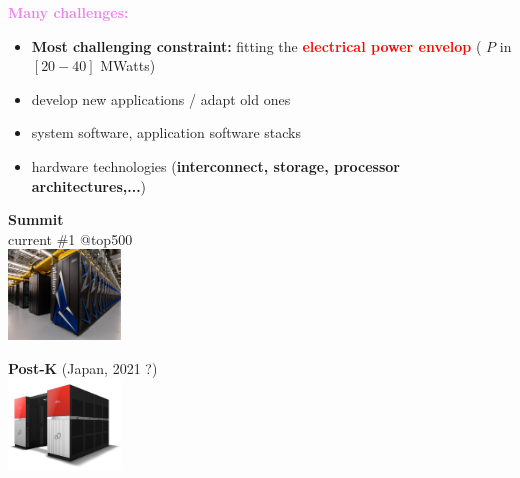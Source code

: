 \begin{frame}
{\begin{minipage}{0.75\linewidth}
      \textcolor{violet}{\bf \large Many challenges:}
      \begin{itemize}
      \item {\bf Most challenging constraint:} fitting the \textcolor{red}{\bf electrical power envelop} ( $P$ in  $[20 - 40]$ MWatts)
      \item develop new applications / adapt old ones
      \item system software, application software stacks
      \item hardware technologies ({\bf interconnect, storage, processor architectures,...})
      \end{itemize}      
    \end{minipage}
    \begin{minipage}{0.24\linewidth}
      {\scriptsize {\bf Summit}\\current \#1 @top500}\\
      \includegraphics[width=3cm]{images/exascale/Summit_ORNL-2060x1648}
      
      {\scriptsize {\bf Post-K} (Japan, 2021 ?)}\\
      \includegraphics[width=3cm]{images/exascale/fujitsu-100677939-large}
    \end{minipage}
  }
    

\end{frame}
